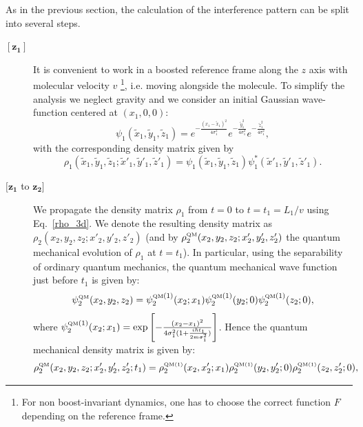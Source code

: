 \documentclass[12pt,groupedaddress,pra,aps]{revtex4-1}
\begin{document}
As in the previous section, the calculation of the interference pattern can be split into several steps.
\begin{description}
\item[$\boldsymbol{[z_1]}$] It is convenient to work in a boosted reference frame along the $z$ axis with molecular velocity $v$ \footnote{For non boost-invariant dynamics, one has to choose the correct function $F$ depending on the reference frame.}, i.e. moving alongside the molecule. To simplify the analysis we neglect gravity and we consider an initial Gaussian wave-function centered at $(x_1, 0,0)$: 
\begin{equation}\label{init_3d_psi}
\psi_1(\tilde{x}_1,\tilde{y}_1,\tilde{z}_1)=e^{-\frac{(x_1-\tilde{x}_1)^2}{4 \sigma_1^2}}
e^{-\frac{\tilde{y}_1^2}{4 \sigma_1^2}}
e^{-\frac{\tilde{z}_1^2}{4 \sigma_1^2}},
\end{equation}
with the corresponding density matrix given by 
\begin{equation}\label{init_3d_rho}
\rho_1(\tilde{x}_1,\tilde{y}_1,\tilde{z}_1 ;\tilde{x}'_1, \tilde{y}'_1,\tilde{z}'_1)=\psi_1(\tilde{x}_1,\tilde{y}_1,\tilde{z}_1)\psi_1^*(\tilde{x}'_1,\tilde{y}'_1,\tilde{z}'_1).
\end{equation}
\item[$\boldsymbol{[z_1}$ to $\boldsymbol{z_2]}$] We propagate the density matrix $\rho_1$ from $t=0$ to  $t=t_1=L_1/v$ using Eq.~\eqref{rho_3d}. We denote the resulting density matrix as $\rho_2(x_2, y_2, z_2;x'_2, y'_2, z'_2)$ (and by $\rho^{\text{\tiny QM}}_2(x_2, y_2, z_2;x'_2, y'_2, z'_2)$ the quantum mechanical evolution of $\rho_1$ at $t=t_1$). In particular, using the separability of ordinary quantum mechanics, the quantum mechanical wave function just before $t_1$ is given by:
\begin{equation}\label{grating_3d_2}
\psi_2^{\text{\tiny QM}}(x_2, y_2, z_2) = \psi_2^{\text{\tiny QM}(1)}(x_2;x_1) \psi_2^{\text{\tiny QM}(1)}(y_2;0) \psi_2^{\text{\tiny QM}(1)}(z_2;0),
\end{equation}
where $\psi_2^{\text{\tiny QM}(1)}(x_2;x_1)=\exp \left[-\frac{(x_2-x_1)^2}{4 \sigma_1^2 (1+\frac{i\hbar t_1}{2 m \sigma_1^2})} \right]$. Hence the quantum mechanical density matrix is given by:
\begin{equation}\label{grating_3d_rho}
\rho^{\text{\tiny QM}}_2(x_2, y_2, z_2;x'_2, y'_2, z'_2;t_1) = 
\rho^{\text{\tiny QM(1)}}_2(x_2,x'_2;x_1)
\rho^{\text{\tiny QM(1)}}_2(y_2,y'_2;0)
\rho^{\text{\tiny QM(1)}}_2(z_2,z'_2;0),
\end{equation}

\end{description}
\end{document}
